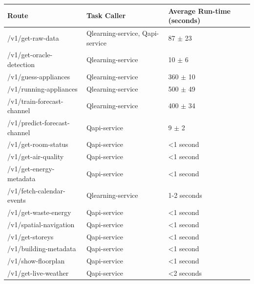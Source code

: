  
\begin{table}[]
\begin{tabular}{|l|l|l|}
\hline
Route                             & Task Caller                     & Average Run-time (seconds) \\ \hline
/v1/get-raw-data                  & Qlearning-service, Qapi-service & 87 $\pm$ 23                \\ \hline
/v1/get-oracle-detection          & Qlearning-service               & 10 $\pm$ 6                 \\ \hline
/v1/guess-appliances              & Qlearning-service               & 360 $\pm$ 10               \\ \hline
/v1/running-appliances            & Qlearning-service               & 500 $\pm$ 49               \\ \hline
/v1/train-forecast-channel        & Qlearning-service               & 400 $\pm$ 34               \\ \hline
/v1/predict-forecast-channel      & Qapi-service                    & 9 $\pm$ 2                  \\ \hline
/v1/get-room-status               & Qapi-service                    & \textless 1 second         \\ \hline
/v1/get-air-quality               & Qapi-service                    & \textless 1 second         \\ \hline
/v1/get-energy-metadata           & Qapi-service                    & \textless 1 second         \\ \hline
/v1/fetch-calendar-events         & Qlearning-service               & 1-2 seconds                \\ \hline
/v1/get-waste-energy              & Qapi-service                    & \textless 1 second         \\ \hline
/v1/spatial-navigation            & Qapi-service                    & \textless 1 second         \\ \hline
/v1/get-storeys                   & Qapi-service                    & \textless 1 second         \\ \hline
/v1/building-metadata             & Qapi-service                    & \textless 1 second         \\ \hline
/v1/show-floorplan                & Qapi-service                    & \textless 1 second         \\ \hline
/v1/get-live-weather              & Qapi-service                    & \textless 2 seconds        \\ \hline

\end{tabular}
\end{table}
